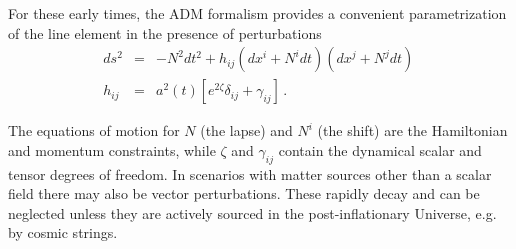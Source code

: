 

For these early times, the ADM formalism \cite{Arnowitt:1962hi}
provides a convenient parametrization of the line element in the presence of perturbations
\begin{eqnarray}
\label{eq:metric}
ds^2&=&-N^2dt^2 +h_{ij}(dx^i+N^idt)(dx^j+N^jdt)\,\nonumber\\
h_{ij}&=&a^2(t)[e^{2\zeta}\delta_{ij}+\gamma_{ij}]\,.
\end{eqnarray}

The equations of motion for $N$ (the lapse) and $N^i$ (the shift) are the Hamiltonian and momentum constraints, while $\zeta$ 
and $\gamma_{ij}$ contain the dynamical scalar and tensor degrees of freedom. In scenarios with matter sources other than a scalar field there may also be vector perturbations. These rapidly decay and can be neglected unless they are actively sourced in the post-inflationary Universe, e.g. by cosmic strings.

